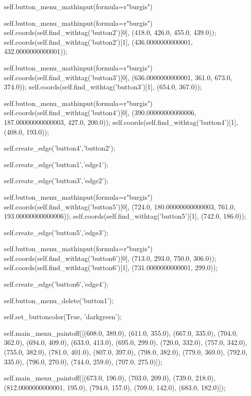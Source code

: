 self.button_menu_mathinput(formula=r"burgis")

self.button_menu_mathinput(formula=r"burgis")
self.coords(self.find_withtag('button2')[0], (418.0, 426.0, 455.0, 439.0));
self.coords(self.find_withtag('button2')[1], (436.0000000000001, 432.0000000000001));

self.button_menu_mathinput(formula=r"burgis")
self.coords(self.find_withtag('button3')[0], (636.0000000000001, 361.0, 673.0, 374.0));
self.coords(self.find_withtag('button3')[1], (654.0, 367.0));

self.button_menu_mathinput(formula=r"burgis")
self.coords(self.find_withtag('button4')[0], (390.00000000000006, 187.00000000000003, 427.0, 200.0));
self.coords(self.find_withtag('button4')[1], (408.0, 193.0));

self.create_edge('button4','button2');

self.create_edge('button1','edge1');

self.create_edge('button3','edge2');

self.button_menu_mathinput(formula=r"burgis")
self.coords(self.find_withtag('button5')[0], (724.0, 180.00000000000003, 761.0, 193.00000000000006));
self.coords(self.find_withtag('button5')[1], (742.0, 186.0));

self.create_edge('button5','edge3');

self.button_menu_mathinput(formula=r"burgis")
self.coords(self.find_withtag('button6')[0], (713.0, 293.0, 750.0, 306.0));
self.coords(self.find_withtag('button6')[1], (731.0000000000001, 299.0));

self.create_edge('button6','edge4');

self.button_menu_delete('button1');

self.set_buttoncolor(True, 'darkgreen');

self.main_menu_paintoff([(608.0, 389.0), (611.0, 355.0), (667.0, 335.0), (704.0, 362.0), (694.0, 409.0), (633.0, 413.0), (695.0, 299.0), (720.0, 332.0), (757.0, 342.0), (755.0, 382.0), (781.0, 401.0), (807.0, 397.0), (798.0, 382.0), (779.0, 369.0), (792.0, 335.0), (796.0, 270.0), (744.0, 259.0), (707.0, 275.0)]);

self.main_menu_paintoff([(673.0, 196.0), (703.0, 209.0), (739.0, 218.0), (812.0000000000001, 195.0), (794.0, 157.0), (709.0, 142.0), (683.0, 182.0)]);

